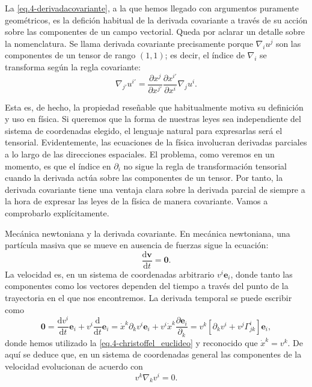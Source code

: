 La \cref{eq.4-derivadacovariante}, a la que hemos llegado con argumentos puramente geométricos, es la defición habitual de la derivada covariante a través de su acción sobre las componentes de un campo vectorial. Queda por aclarar un detalle sobre la nomenclatura. Se llama derivada covariante precisamente porque \(\nabla_i u^j\) son las componentes de un tensor de rango \((1, 1)\); es decir, el índice de \(\nabla_i\) se transforma según la regla covariante:
\begin{equation}
    \nabla_{j'}u^{i'} = \frac{\partial x^j}{\partial x^{j'}} \frac{\partial x^{i'}}{\partial x^i} \nabla_j u^i.
\end{equation}

Esta es, de hecho, la propiedad reseñable que habitualmente motiva su definición y uso en física. Si queremos que la forma de nuestras leyes sea independiente del sistema de coordenadas elegido, el lenguaje natural para expresarlas será el tensorial. Evidentemente, las ecuaciones de la física involucran derivadas parciales a lo largo de las direcciones espaciales. El problema, como veremos en un momento, es que el índice en \(\partial_i\) no sigue la regla de transformación tensorial cuando la derivada actúa sobre las componentes de un tensor. Por tanto, la derivada covariante tiene una ventaja clara sobre la derivada parcial de siempre a la hora de expresar las leyes de la física de manera covariante. Vamos a comprobarlo explícitamente.

\begin{example}
    {Mecánica newtoniana y la derivada covariante.
    \label{ej.4-newton_covariante}}
    En mecánica newtoniana, una partícula masiva que se mueve en ausencia de fuerzas sigue la ecuación:
    \begin{equation*}
        \frac{\mathrm{d}\mathbf{v}}{\mathrm{d}t} = \mathbf{0}.
    \end{equation*}
    La velocidad es, en un sistema de coordenadas arbitrario \(v^i\mathbf{e}_i\), donde tanto las componentes como los vectores dependen del tiempo a través del punto de la trayectoria en el que nos encontremos. La derivada temporal se puede escribir como
    \begin{equation*}
        \mathbf{0} = \frac{\mathrm{d}v^i}{\mathrm{d}t} \mathbf{e}_i + v^i \frac{\mathrm{d}}{\mathrm{d}t} \mathbf{e}_i = \dot{x}^k\partial_k v^i \mathbf{e}_i + v^i \dot{x}^k \frac{\partial\mathbf{e}_i}{\partial_k} = v^k\left[\partial_k{v}^i + v^j \Gamma^{i}_{jk}\right]\mathbf{e}_i,
    \end{equation*}
    donde hemos utilizado la \cref{eq.4-christoffel_euclideo} y reconocido que \(\dot{x}^k=v^k\). De aquí se deduce que, en un sistema de coordenadas general las componentes de la velocidad evolucionan de acuerdo con
    \begin{equation*}
        v^k\nabla_k v^i = 0.
    \end{equation*}
\end{example}

